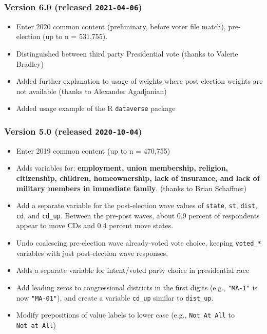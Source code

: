 \documentclass[10pt,article,oneside]{memoir}
\begin{document}
\subsubsection{\texorpdfstring{Version 6.0 (released
\texttt{2021-04-06})}{Version 6.0 (released 2021-04-06)}}\label{version-6.0-released-2021-04-06}

\begin{itemize}
\tightlist
\item
  Enter 2020 common content (preliminary, before voter file match),
  pre-election (up to n = 531,755).
\item
  Distinguished between third party Presidential vote (thanks to Valerie
  Bradley)
\item
  Added further explanation to usage of weights where post-election
  weights are not available (thanks to Alexander Agadjanian)
\item
  Added usage example of the R \texttt{dataverse} package
\end{itemize}

\subsubsection{\texorpdfstring{Version 5.0 (released
\texttt{2020-10-04})}{Version 5.0 (released 2020-10-04)}}\label{version-5.0-released-2020-10-04}

\begin{itemize}
\tightlist
\item
  Enter 2019 common content (up to n = 470,755)
\item
  Adds variables for: \textbf{employment, union membership, religion,
  citizenship, children, homeownership, lack of insurance, and lack of
  military members in immediate family}. (thanks to Brian Schaffner)
\item
  Add a separate variable for the post-election wave values of
  \texttt{state}, \texttt{st}, \texttt{dist}, \texttt{cd}, and
  \texttt{cd\_up}. Between the pre-post waves, about 0.9 percent of
  respondents appear to move CDs and 0.4 percent move states.
\item
  Undo coalescing pre-election wave already-voted vote choice, keeping
  \texttt{voted\_*} variables with just post-election wave responses.
\item
  Adds a separate variable for intent/voted party choice in presidential
  race
\item
  Add leading zeros to congressional districts in the first digits
  (e.g., \texttt{"MA-1"} is now \texttt{"MA-01"}), and create a variable
  \texttt{cd\_up} similar to \texttt{dist\_up}.
\item
  Modify prepositions of value labels to lower case (e.g.,
  \texttt{Not\ At\ All} to \texttt{Not\ at\ All})
\end{itemize}
\end{document}
